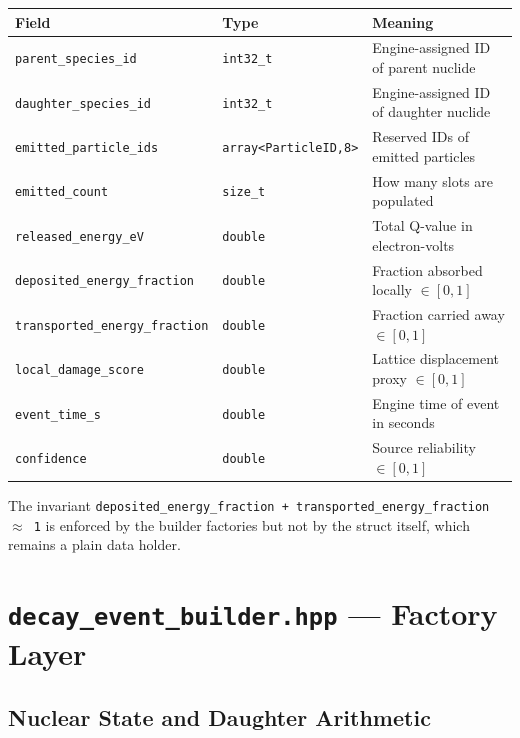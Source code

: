 \documentclass[11pt,a4paper]{article}
\begin{document}
\begin{center}
\begin{tabular}{lll}
\toprule
\textbf{Field} & \textbf{Type} & \textbf{Meaning} \\
\midrule
\texttt{parent\_species\_id}            & \texttt{int32\_t} & Engine-assigned ID of parent nuclide \\
\texttt{daughter\_species\_id}          & \texttt{int32\_t} & Engine-assigned ID of daughter nuclide \\
\texttt{emitted\_particle\_ids}         & \texttt{array<ParticleID,8>} & Reserved IDs of emitted particles \\
\texttt{emitted\_count}                 & \texttt{size\_t}  & How many slots are populated \\
\texttt{released\_energy\_eV}           & \texttt{double}   & Total Q-value in electron-volts \\
\texttt{deposited\_energy\_fraction}    & \texttt{double}   & Fraction absorbed locally $\in [0,1]$ \\
\texttt{transported\_energy\_fraction}  & \texttt{double}   & Fraction carried away $\in [0,1]$ \\
\texttt{local\_damage\_score}           & \texttt{double}   & Lattice displacement proxy $\in [0,1]$ \\
\texttt{event\_time\_s}                 & \texttt{double}   & Engine time of event in seconds \\
\texttt{confidence}                     & \texttt{double}   & Source reliability $\in [0,1]$ \\
\bottomrule
\end{tabular}
\end{center}

The invariant \texttt{deposited\_energy\_fraction + transported\_energy\_fraction $\approx$ 1}
is enforced by the builder factories but not by the struct itself, which
remains a plain data holder.

\section{\texttt{decay\_event\_builder.hpp} --- Factory Layer}
\label{sec:builder}

\subsection{Nuclear State and Daughter Arithmetic}
\end{document}
